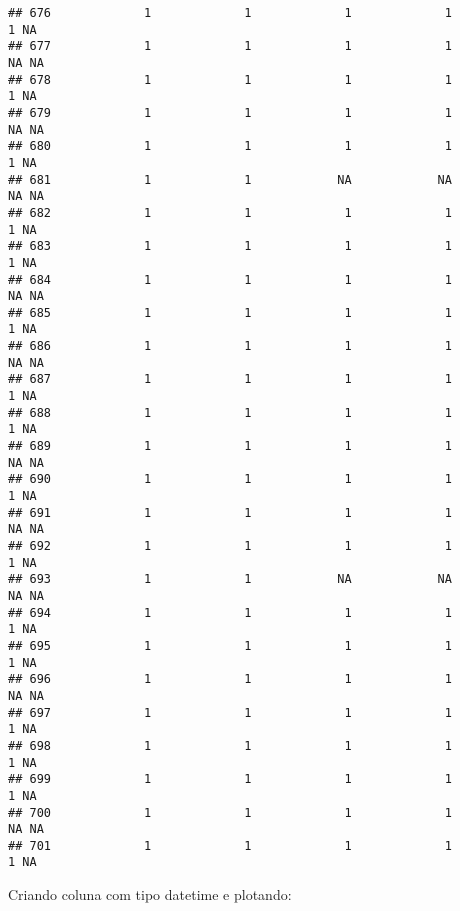 \documentclass[
]{article}
\newenvironment{Shaded}{\begin{snugshade}}{\end{snugshade}}
\newcommand{\AttributeTok}[1]{\textcolor[rgb]{0.77,0.63,0.00}{#1}}
\newcommand{\FunctionTok}[1]{\textcolor[rgb]{0.00,0.00,0.00}{#1}}
\newcommand{\NormalTok}[1]{#1}
\newcommand{\OtherTok}[1]{\textcolor[rgb]{0.56,0.35,0.01}{#1}}
\newcommand{\SpecialCharTok}[1]{\textcolor[rgb]{0.00,0.00,0.00}{#1}}
\newcommand{\StringTok}[1]{\textcolor[rgb]{0.31,0.60,0.02}{#1}}
\begin{document}
\begin{verbatim}
## 676             1             1             1             1             1 NA
## 677             1             1             1             1            NA NA
## 678             1             1             1             1             1 NA
## 679             1             1             1             1            NA NA
## 680             1             1             1             1             1 NA
## 681             1             1            NA            NA            NA NA
## 682             1             1             1             1             1 NA
## 683             1             1             1             1             1 NA
## 684             1             1             1             1            NA NA
## 685             1             1             1             1             1 NA
## 686             1             1             1             1            NA NA
## 687             1             1             1             1             1 NA
## 688             1             1             1             1             1 NA
## 689             1             1             1             1            NA NA
## 690             1             1             1             1             1 NA
## 691             1             1             1             1            NA NA
## 692             1             1             1             1             1 NA
## 693             1             1            NA            NA            NA NA
## 694             1             1             1             1             1 NA
## 695             1             1             1             1             1 NA
## 696             1             1             1             1            NA NA
## 697             1             1             1             1             1 NA
## 698             1             1             1             1             1 NA
## 699             1             1             1             1             1 NA
## 700             1             1             1             1            NA NA
## 701             1             1             1             1             1 NA
\end{verbatim}

\newline

Criando coluna com tipo datetime e plotando:

\begin{Shaded}
\end{Shaded}
\end{document}
